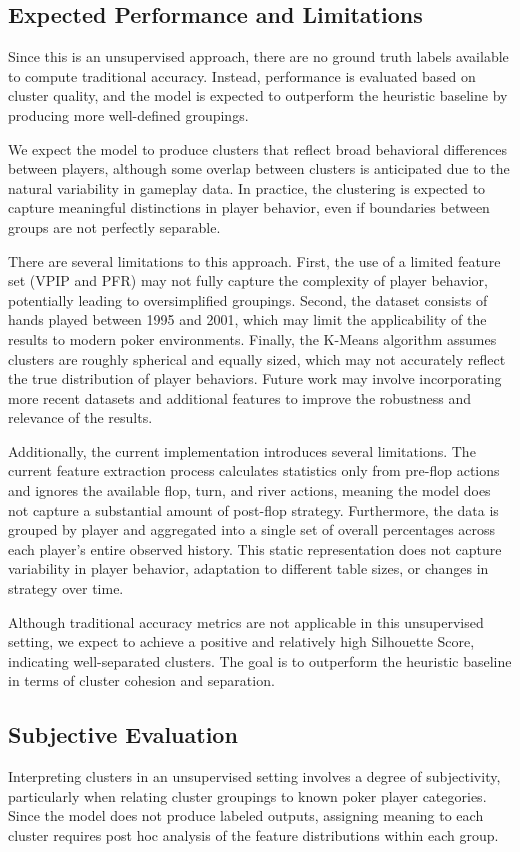 \documentclass[11pt]{extarticle}
\begin{document}
\subsection{Expected Performance and Limitations}
Since this is an unsupervised approach, there are no ground truth labels available to compute traditional accuracy. Instead, performance is evaluated based on cluster quality, and the model is expected to outperform the heuristic baseline by producing more well-defined groupings.

We expect the model to produce clusters that reflect broad behavioral differences between players, although some overlap between clusters is anticipated due to the natural variability in gameplay data. In practice, the clustering is expected to capture meaningful distinctions in player behavior, even if boundaries between groups are not perfectly separable.

There are several limitations to this approach. First, the use of a limited feature set (VPIP and PFR) may not fully capture the complexity of player behavior, potentially leading to oversimplified groupings. Second, the dataset consists of hands played between 1995 and 2001, which may limit the applicability of the results to modern poker environments. Finally, the K-Means algorithm assumes clusters are roughly spherical and equally sized, which may not accurately reflect the true distribution of player behaviors. Future work may involve incorporating more recent datasets and additional features to improve the robustness and relevance of the results.

Additionally, the current implementation introduces several limitations. The current feature extraction process calculates statistics only from pre-flop actions and ignores the available flop, turn, and river actions, meaning the model does not capture a substantial amount of post-flop strategy. Furthermore, the data is grouped by player and aggregated into a single set of overall percentages across each player’s entire observed history. This static representation does not capture variability in player behavior, adaptation to different table sizes, or changes in strategy over time.

Although traditional accuracy metrics are not applicable in this unsupervised setting, we expect to achieve a positive and relatively high Silhouette Score, indicating well-separated clusters. The goal is to outperform the heuristic baseline in terms of cluster cohesion and separation.

\subsection{Subjective Evaluation}
Interpreting clusters in an unsupervised setting involves a degree of subjectivity, particularly when relating cluster groupings to known poker player categories. Since the model does not produce labeled outputs, assigning meaning to each cluster requires post hoc analysis of the feature distributions within each group.
\end{document}

